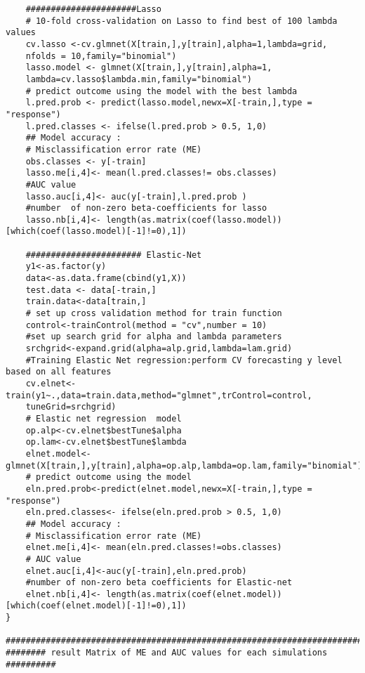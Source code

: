 \documentclass[12pt]{report}
\begin{document}
\begin{lstlisting}
	######################Lasso
	# 10-fold cross-validation on Lasso to find best of 100 lambda values
	cv.lasso <-cv.glmnet(X[train,],y[train],alpha=1,lambda=grid,
	nfolds = 10,family="binomial")
	lasso.model <- glmnet(X[train,],y[train],alpha=1,
	lambda=cv.lasso$lambda.min,family="binomial")
	# predict outcome using the model with the best lambda
	l.pred.prob <- predict(lasso.model,newx=X[-train,],type = "response")
	l.pred.classes <- ifelse(l.pred.prob > 0.5, 1,0)
	## Model accuracy :
	# Misclassification error rate (ME)
	obs.classes <- y[-train]
	lasso.me[i,4]<- mean(l.pred.classes!= obs.classes)
	#AUC value
	lasso.auc[i,4]<- auc(y[-train],l.pred.prob )
	#number  of non-zero beta-coefficients for lasso
	lasso.nb[i,4]<- length(as.matrix(coef(lasso.model))[which(coef(lasso.model)[-1]!=0),1])
	
	####################### Elastic-Net
	y1<-as.factor(y)
	data<-as.data.frame(cbind(y1,X))
	test.data <- data[-train,]
	train.data<-data[train,]
	# set up cross validation method for train function
	control<-trainControl(method = "cv",number = 10)
	#set up search grid for alpha and lambda parameters
	srchgrid<-expand.grid(alpha=alp.grid,lambda=lam.grid)
	#Training Elastic Net regression:perform CV forecasting y level based on all features
	cv.elnet<-train(y1~.,data=train.data,method="glmnet",trControl=control,
	tuneGrid=srchgrid)
	# Elastic net regression  model 
	op.alp<-cv.elnet$bestTune$alpha
	op.lam<-cv.elnet$bestTune$lambda
	elnet.model<-glmnet(X[train,],y[train],alpha=op.alp,lambda=op.lam,family="binomial")
	# predict outcome using the model
	eln.pred.prob<-predict(elnet.model,newx=X[-train,],type = "response")
	eln.pred.classes<- ifelse(eln.pred.prob > 0.5, 1,0)
	## Model accuracy :
	# Misclassification error rate (ME)
	elnet.me[i,4]<- mean(eln.pred.classes!=obs.classes)
	# AUC value
	elnet.auc[i,4]<-auc(y[-train],eln.pred.prob)
	#number of non-zero beta coefficients for Elastic-net
	elnet.nb[i,4]<- length(as.matrix(coef(elnet.model))[which(coef(elnet.model)[-1]!=0),1])
}

################################################################################
######## result Matrix of ME and AUC values for each simulations ##########


\end{lstlisting}
\end{document}
